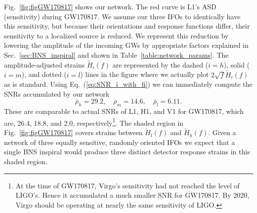 \documentclass[amsmath,amssymb,aps,floats,amsfonts,notitlepage,superscriptaddress,eqsecnum,nofootinbib,10pt]{revtex4-1}
\newcommand{\be}{\begin{equation}}
\newcommand{\ee}{\end{equation}}
\begin{document}
Fig.~\ref{fig:figGW170817} shows our network. The red curve is L1's ASD (sensitivity) during GW170817. We assume our three IFOs to identically have this sensitivity,
but because their orientations and response functions differ, their sensitivity to a localized source is reduced. We represent this reduction by lowering the
amplitude of the incoming GWs by appropriate factors explained in Sec.~\ref{sec:BNS_inspiral} and shown in Table~\ref{table:network_params}.
The amplitude-adjusted strains $ \tilde{H}_i(f)$ are represented by the dashed ($i=h$), solid ($i=m$), and dotted ($i=l$) lines in the figure where we actually plot
$2\sqrt{f} \tilde{H}_i(f)$ as is standard. 
Using Eq.~(\ref{eq:SNR_i_with_fi}) we can immediately compute the SNRs accumulated by our network
%
\be
\bar\rho_h = 29.2,\quad \bar\rho_m = 14.6,\quad \bar\rho_l = 6.11 \label{eq:GW170817_SNRs}.
\ee
%
These are comparable to actual SNRs of L1, H1, and V1 for GW170817, which are, 26.4, 18.8, and 2.0, respectively\footnote{At the time of GW170817, Virgo's sensitivity had not reached the level of LIGO's. Hence it accumulated a much smaller SNR for GW170817. By 2020, Virgo should be operating at nearly the same sensitivity of LIGO.}.
The shaded region in Fig.~\ref{fig:figGW170817} covers strains between $\tilde{H}_l(f)$ and $\tilde{H}_h(f)$. %
Given a network of three equally sensitive, randomly oriented IFOs we expect that a single BNS inspiral would produce three distinct detector
response strains in this shaded region.
%
%
\end{document}
